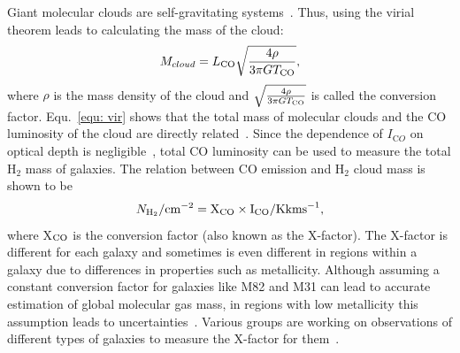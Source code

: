 Giant molecular clouds are self-gravitating systems~\citep[e.g.][]{Efstathiou83,Blitz99}.
Thus, using the virial theorem leads to calculating the mass of the cloud: 
\begin{equation}
 \label{equ: vir}
 M_{cloud} = L_{\rm CO} \sqrt{\frac{4\rho}{3\pi G T_{\rm CO}}},
\end{equation}
where $\rho$ is the mass density of the cloud and $\sqrt{\frac{4\rho}{3\pi G T_{\rm CO}}}$ is called the conversion factor.
Equ.~\ref{equ: vir} shows that the total mass of molecular clouds and the CO luminosity of the cloud are directly related~\citep{Young91}. 
Since the dependence of $I_{\mathrm CO}$ on optical depth is negligible~\citep{Krumholz09}, total CO luminosity can be used to measure the total H$_2$ mass of galaxies.
The relation between CO emission and H$_2$ cloud mass is shown to be
\begin{equation}
N_{\rm H_2}/\rm cm^{-2} = X_{\rm CO} \times I_{\rm CO}/{\rm K km s}^{-1},
\end{equation}
where X$_{\rm CO}$ is the conversion factor (also known as the X-factor).
The X-factor is different for each galaxy and sometimes is even different in regions within a galaxy due to differences in properties such as metallicity.
Although assuming a constant conversion factor for galaxies like M82 and M31 can lead to accurate estimation of global molecular gas mass, in regions with low metallicity this assumption leads to uncertainties~\citep{Bolato13}. 
Various groups are working on observations of different types of galaxies to measure the X-factor for them~\citep{Wilson95, Bosselli02, Bolato13}.


